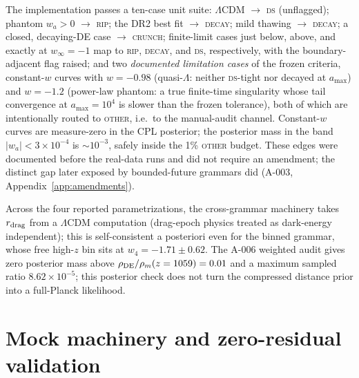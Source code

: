 \documentclass[a4paper,11pt]{article}
\newcommand{\lcdm}{\ensuremath{\Lambda\mathrm{CDM}}}
\newcommand{\wa}{\ensuremath{w_a}}
\begin{document}
The implementation passes a ten-case unit suite: \lcdm{}
$\to$ \textsc{ds} (unflagged); phantom $\wa>0$ $\to$ \textsc{rip}; the DR2
best fit $\to$ \textsc{decay}; mild thawing $\to$ \textsc{decay}; a closed,
decaying-DE case $\to$ \textsc{crunch}; finite-limit cases just below,
above, and exactly at $w_\infty=-1$ map to \textsc{rip}, \textsc{decay},
and \textsc{ds}, respectively, with the boundary-adjacent flag raised; and two
\emph{documented limitation cases} of the frozen criteria, constant-$w$
curves with $w=-0.98$ (quasi-$\Lambda$: neither \textsc{ds}-tight nor
decayed at $a_{\max}$) and $w=-1.2$ (power-law phantom: a true finite-time
singularity whose tail convergence at $a_{\max}=10^4$ is slower than the
frozen tolerance), both of which are intentionally routed to \textsc{other},
i.e.\ to the manual-audit channel. Constant-$w$ curves are measure-zero in
the CPL posterior; the posterior mass in the band $|\wa|<3\times10^{-4}$ is
$\sim10^{-3}$, safely inside the 1\% \textsc{other} budget. These edges were
documented before the real-data runs and did not require an amendment; the
distinct gap later exposed by bounded-future grammars did (A-003,
Appendix~\ref{app:amendments}).

Across the four reported parametrizations, the cross-grammar machinery takes
$r_{\rm drag}$ from a \lcdm{} computation (drag-epoch physics treated as
dark-energy independent); this is self-consistent a posteriori even for the
binned grammar, whose free high-$z$ bin sits at $w_4=-1.71\pm0.62$. The A-006
weighted audit gives zero posterior mass above
$\rho_{\rm DE}/\rho_m(z=1059)=0.01$ and a maximum sampled ratio
$8.62\times10^{-5}$; this posterior check does not turn the compressed
distance prior into a full-Planck likelihood.

\section{Mock machinery and zero-residual validation}\label{app:mocks}
\end{document}
